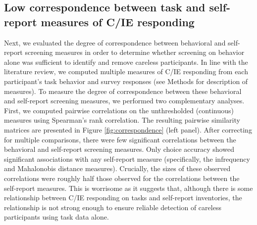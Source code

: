 \documentclass[a4paper,notitlepage,12pt]{article}
\begin{document}
\begin{refsection}[main]
\subsection{Low correspondence between task and self-report measures of C/IE responding}

Next, we evaluated the degree of correspondence between behavioral and self-report screening measures in order to determine whether screening on behavior alone was sufficient to identify and remove careless participants. In line with the literature review, we computed multiple measures of C/IE responding from each participant's task behavior and survey responses (see Methods for description of measures). To measure the degree of correspondence between these behavioral and self-report screening measures, we performed two complementary analyses. First, we computed pairwise correlations on the unthresholded (continuous) measures using Spearman's rank correlation. The resulting pairwise similarity matrices are presented in Figure \ref{fig:correspondence} (left panel). After correcting for multiple comparisons, there were few significant correlations between the behavioral and self-report screening measures. Only choice accuracy showed significant associations with any self-report measure (specifically, the infrequency and Mahalonobis distance measures). Crucially, the sizes of these observed correlations were roughly half those observed for the correlations between the self-report measures. This is worrisome as it suggests that, although there is some relationship between C/IE responding on tasks and self-report inventories, the relationship is not strong enough to ensure reliable detection of careless participants using task data alone.


\end{refsection}
\end{document}

